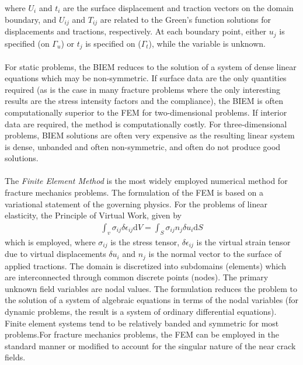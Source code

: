 \documentclass[11pt]{article}
\begin{document}
where $U_i$ and $t_i$ are the surface displacement and traction vectors on the domain boundary, and
$U_{ij}$ and $T_{ij}$ are related to the Green's function solutions for displacements and tractions,
respectively. At each boundary point, either $u_j$ is specified (on $\varGamma_u$) or $t_j$ is specified on ($\varGamma_t$), while
the variable is unknown.
\\\\
For static problems, the BIEM
reduces to the solution of a system of dense linear equations which may be non-symmetric. If
surface data are the only quantities required (as is the case in many fracture problems where the
only interesting results are the stress intensity factors and the compliance), the BIEM is often
computationally superior to the FEM for two-dimensional problems. If interior data are required,
the method is computationally costly. For three-dimensional problems, BIEM solutions are often
very expensive as the resulting linear system is dense, unbanded and often non-symmetric, and often
do not produce good solutions.
\\\\
The \textit{Finite Element Method} is the most widely employed numerical method for fracture mechanics problems.
The formulation of the FEM is based on a variational statement of the governing physics. For the
problems of linear elasticity, the Principle of Virtual Work, given by
\begin{align*}
    \int_{v}\sigma_{ij} \delta \epsilon_{ij} \text{d} V = \int_S \sigma_{ij} n_j \delta u_i \text{d} S \tag{14} \label{14}
\end{align*}
which is employed, where $\sigma_{ij}$ is the stress tensor, $\delta \epsilon_{ij}$ is the virtual strain tensor due to virtual displacements
$\delta u_i$ and $n_j$
is the normal vector to the surface of applied tractions. The domain is discretized into
subdomains (elements) which are interconnected through common discrete points (nodes). The
primary unknown field variables are nodal values. The formulation reduces the problem to the
solution of a system of algebraic equations in terms of the nodal variables (for dynamic problems,
the result is a system of ordinary differential equations). Finite element systems tend to be relatively
banded and symmetric for most problems.For fracture mechanics problems, the FEM can be employed in the standard manner or
modified to account for the singular nature of the near crack fields.
\end{document}
